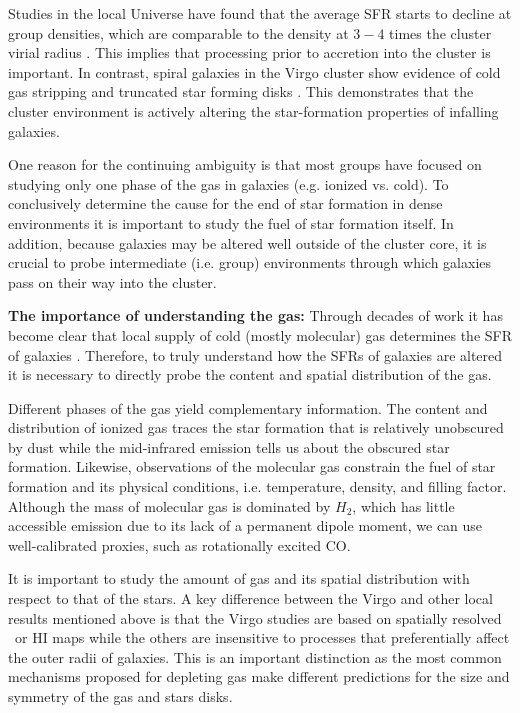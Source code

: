\documentclass[11pt]{article}
\begin{document}
Studies in the local Universe have found
that the average SFR starts to decline at group densities, which are
comparable to the density at $3-4$ times the cluster virial radius
\citep{Lewis02,Gomez03}.  This implies that processing prior to
accretion into the cluster is important.  In contrast, spiral galaxies
in the Virgo cluster show evidence of cold gas stripping and truncated
star forming disks
\citep{Koopmann98,Koopmann04,Dale01,Crowl05,Chung07}.  This
demonstrates that the cluster environment is actively altering the
star-formation properties of infalling galaxies.

One reason for the continuing ambiguity is that most groups have
focused on studying only one phase of the gas in galaxies
(e.g. ionized vs. cold).  To conclusively determine the cause for the
end of star formation in dense environments it is important to study
the fuel of star formation itself.  In addition, because galaxies may
be altered well outside of the cluster core, it is crucial to probe
intermediate (i.e. group) environments through which galaxies pass on
their way into the cluster.

\textbf{The importance of understanding the gas:} Through decades of
work it has become clear that local supply of cold (mostly molecular)
gas determines the SFR of galaxies
\citep{Kennicutt98b,Bigiel08,Leroy08}. Therefore, to truly understand
how the SFRs of galaxies are altered it is necessary to directly probe
the content and spatial distribution of the gas.

Different phases of the gas yield complementary information.  The
content and distribution of ionized gas traces the star formation that
is relatively unobscured by dust while the mid-infrared emission tells
us about the obscured star formation.  Likewise, observations of the
molecular gas constrain the fuel of star formation and its physical
conditions, i.e. temperature, density, and filling factor.  Although
the mass of molecular gas is dominated by $H_2$, which has little
accessible emission due to its lack of a permanent dipole moment, we
can use well-calibrated proxies, such as rotationally excited CO.

It is important to study the amount of gas and its spatial
distribution with respect to that of the stars.  A key difference
between the Virgo and other local results mentioned above is that the
Virgo studies are based on spatially resolved \ha\ or HI maps while
the others are insensitive to processes that preferentially affect the
outer radii of galaxies.  This is an important distinction as the most
common mechanisms proposed for depleting gas make different
predictions for the size and symmetry of the gas and stars disks.
\end{document}
